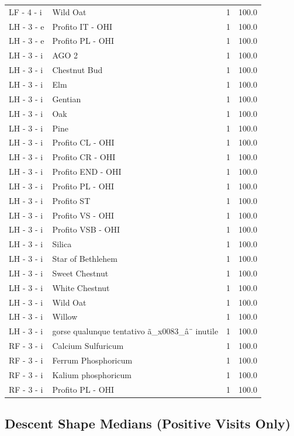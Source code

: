 \documentclass[a4paper,11pt]{article}
\begin{document}
\begin{footnotesize}
\begin{longtable}{p{3.5cm}p{7.5cm}rr}
LF - 4 - i & Wild Oat & 1 & 100.0 \\
LH - 3 - e & Profito IT - OHI & 1 & 100.0 \\
LH - 3 - e & Profito PL - OHI & 1 & 100.0 \\
LH - 3 - i & AGO 2 & 1 & 100.0 \\
LH - 3 - i & Chestnut Bud & 1 & 100.0 \\
LH - 3 - i & Elm & 1 & 100.0 \\
LH - 3 - i & Gentian & 1 & 100.0 \\
LH - 3 - i & Oak & 1 & 100.0 \\
LH - 3 - i & Pine & 1 & 100.0 \\
LH - 3 - i & Profito CL - OHI & 1 & 100.0 \\
LH - 3 - i & Profito CR - OHI & 1 & 100.0 \\
LH - 3 - i & Profito END - OHI & 1 & 100.0 \\
LH - 3 - i & Profito PL - OHI & 1 & 100.0 \\
LH - 3 - i & Profito ST & 1 & 100.0 \\
LH - 3 - i & Profito VS - OHI & 1 & 100.0 \\
LH - 3 - i & Profito VSB - OHI & 1 & 100.0 \\
LH - 3 - i & Silica & 1 & 100.0 \\
LH - 3 - i & Star of Bethlehem & 1 & 100.0 \\
LH - 3 - i & Sweet Chestnut & 1 & 100.0 \\
LH - 3 - i & White Chestnut & 1 & 100.0 \\
LH - 3 - i & Wild Oat & 1 & 100.0 \\
LH - 3 - i & Willow & 1 & 100.0 \\
LH - 3 - i & gorse qualunque tentativo ã\_x0083\_â¨ inutile & 1 & 100.0 \\
RF - 3 - i & Calcium Sulfuricum & 1 & 100.0 \\
RF - 3 - i & Ferrum Phosphoricum & 1 & 100.0 \\
RF - 3 - i & Kalium phosphoricum & 1 & 100.0 \\
RF - 3 - i & Profito PL - OHI & 1 & 100.0 \\
\end{longtable}
\end{footnotesize}

\subsection{Descent Shape Medians (Positive Visits Only)}
\end{document}
